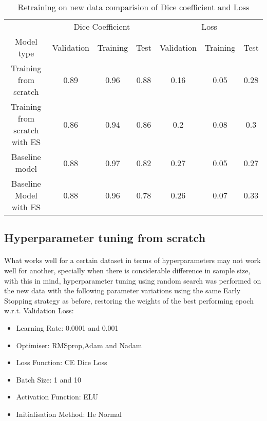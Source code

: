 \begin{table}[ht] 
    \begin{center}
    \begin{tabular}{ccccccc} 
    \toprule
       & \multicolumn{3}{c}{Dice Coefficient}     & \multicolumn{3}{c}{Loss} \\
    Model type & Validation & Training & Test & Validation    & Training    & Test   \\ \midrule
    \rowcolor{lightgray}
    Training from scratch & 0.89 & 0.96 & 0.88 & 0.16 & 0.05 & 0.28  \\ Training from scratch with ES & 0.86 & 0.94 & 0.86 & 0.2 & 0.08 & 0.3  \\ Baseline model & 0.88 & 0.97 & 0.82 & 0.27 & 0.05 & 0.27  \\ Baseline Model with ES & 0.88 & 0.96 & 0.78 & 0.26 & 0.07 & 0.33  \\
    \bottomrule
    \end{tabular}
  \end{center} 
  \caption{Retraining on new data comparision of Dice coefficient and Loss}\label{tab_fs}
\end{table}

\subsection{Hyperparameter tuning from scratch}
\paragraph{}
What works well for a certain dataset in terms of hyperparameters may not work well for another, specially when there is considerable difference in sample size, with this in mind,  hyperparameter tuning using random search was performed on the new data with the following parameter variations using the same Early Stopping strategy as before, restoring the weights of the best performing epoch \gls{w.r.t.} Validation Loss:

\begin{itemize}
    \item{Learning Rate: 0.0001 and 0.001}
    \item{Optimiser: RMSprop,Adam and Nadam}
    \item{Loss Function: CE Dice Loss}
    \item{Batch Size: 1 and 10}
    \item{Activation Function: ELU}
    \item{Initialisation Method: He Normal}
\end{itemize}
